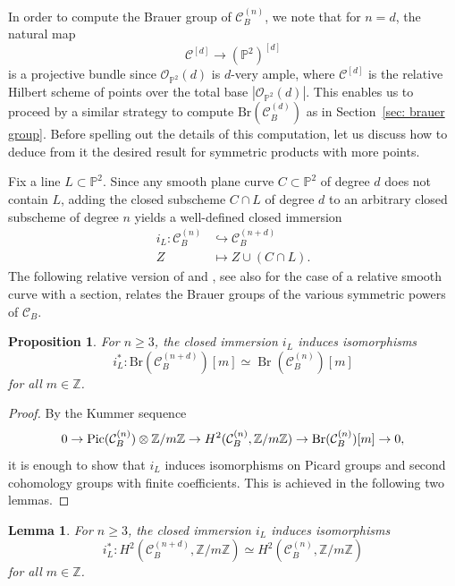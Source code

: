 \documentclass[11pt]{amsart}
\theoremstyle{plain}
\newtheorem{lem}[thm]{Lemma}
\newtheorem{prop}[thm]{Proposition}
\theoremstyle{definition}
\theoremstyle{remark}
\DeclareMathOperator{\Br}{Br}
\newcommand{\Pic}{\mathop{\rm Pic}\nolimits}
\begin{document}
In order to compute the Brauer group of $\mathcal{C}_B^{(n)}$, we note that for $n = d$, the natural map
$$\mathcal C^{[d]} \to (\mathbb P^2)^{[d]}$$
is a projective bundle since $\mathcal O_{\mathbb P^2}(d)$ is $d$-very ample, where $\mathcal{C}^{[d]}$ is the relative Hilbert scheme of points over the total base $|\mathcal O_{\mathbb P^2}(d)|$. This enables us to proceed by a similar strategy to compute $\mathrm{Br}(\mathcal{C}_B^{(d)})$ as in Section~\ref{sec: brauer group}. Before spelling out the details of this computation, let us discuss how to deduce from it the desired result for symmetric products with more points.

\smallskip

Fix a line $L \subset \mathbb P^2$. Since any smooth plane curve $C \subset \mathbb P^2$ of degree $d$ does not contain $L$, adding the closed subscheme $C \cap L$ of degree $d$ to an arbitrary closed subscheme of degree $n$ yields a well-defined closed immersion
    \begin{align*}
    i_L \colon \mathcal C_B^{(n)} &\hookrightarrow \mathcal C_B^{(n+d)}\\
    Z & \mapsto Z \cup (C \cap L). 
    \end{align*}
The following relative version of \cite[\S 4]{brauerquot} and \cite[Theorem~1.2]{brauersymm}, see also \cite[Section~3.1]{huybrechts2025periodindexproblemhyperkahlermanifolds} for the case of a relative smooth curve with a section, relates the Brauer groups of the various symmetric powers of $\mathcal C_B$.

\begin{prop}\label{prop: brauer isom} For $n\geq 3$, the closed immersion $i_L$ induces isomorphisms
 $$i_L^* \colon \mathrm{Br}(\mathcal C_B^{(n+d)})[m] \simeq \Br(\mathcal C^{(n )}_B)[m]$$ for all $m \in \mathbb Z$.
\end{prop}

\begin{proof}
By the Kummer sequence
$$0 \to \Pic(\mathcal C_B^{(n)}) \otimes \mathbb Z / m \mathbb Z \to H^2(\mathcal C_{B}^{(n)}, \mathbb Z /m \mathbb Z) \to \Br(\mathcal C^{(n)}_B)[m] \to 0,$$
it is enough to show that $i_L$ induces isomorphisms on Picard groups and second cohomology groups with finite coefficients. This is achieved in the following two lemmas.
\end{proof}

\begin{lem}\label{lem: h2 iso}
   For $n\geq 3$, the closed immersion $i_L$ induces isomorphisms
    $$i_L^* \colon H^2(\mathcal C_B^{(n+d)}, \mathbb Z / m \mathbb Z) \simeq H^2(\mathcal{C}_B^{(n)}, \mathbb Z / m \mathbb Z)$$
    for all $m \in \mathbb Z$.
\end{lem}
\end{document}
